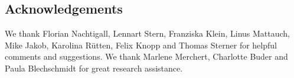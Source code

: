\documentclass[12pt, a4paper]{article}
\begin{document}
\subsection{Acknowledgements} \label{acknowledgements}

We thank Florian Nachtigall, Lennart Stern, Franziska Klein, Linus Mattauch, Mike Jakob, Karolina Rütten, Felix Knopp and Thomas Sterner for helpful comments and suggestions. 
We thank Marlene Merchert, Charlotte Buder and Paula Blechschmidt for great research assistance. 

\end{document}
